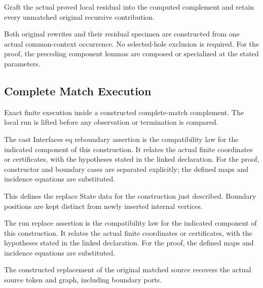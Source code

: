 Graft the actual proved local residual into the computed complement and retain every unmatched original recursive contribution.
\par{}

Both original rewrites and their residual specimen are constructed from one actual common-context occurrence. No selected-hole exclusion is required.
For the proof, the preceding component lemmas are composed or specialized at the stated parameters.
\par{}

\subsection{Complete Match Execution}
Exact finite execution inside a constructed complete-match complement. The local run is lifted before any observation or termination is compared.

The cast Interfaces eq reboundary assertion is the compatibility law for the indicated component of this construction. It relates the actual finite coordinates or certificates, with the hypotheses stated in the linked declaration.
For the proof, constructor and boundary cases are separated explicitly; the defined maps and incidence equations are substituted.
\par{}

This defines the replace State data for the construction just described. Boundary positions are kept distinct from newly inserted internal vertices.
\par{}

The run replace assertion is the compatibility law for the indicated component of this construction. It relates the actual finite coordinates or certificates, with the hypotheses stated in the linked declaration.
For the proof, the defined maps and incidence equations are substituted.
\par{}

The constructed replacement of the original matched source recovers the actual source token and graph, including boundary ports.
\par{}

